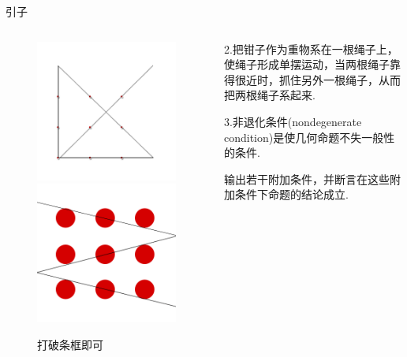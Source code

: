 \documentclass[UTF8, aspectratio=169, 10pt, t]{ctexbeamer}
\begin{document}
\begin{frame}{引子}
	\begin{columns}[c]
		\begin{column}{0.5\textwidth}
			\begin{figure}
				\centering
				\includegraphics[width=0.45\linewidth]{i2}
				\includegraphics[width=0.45\linewidth]{i3}
				\caption{打破条框即可}
				\label{fig:i2}
			\end{figure}
		\end{column}
		\begin{column}{0.5\textwidth}
			2.把钳子作为重物系在一根绳子上，使绳子形成单摆运动，当两根绳子靠得很近时，抓住另外一根绳子，从而把两根绳子系起来. 
			
			\vspace{1em}
			
			3.非退化条件(nondegenerate condition)是使几何命题不失一般性的条件.
			
			\vspace{1em}
			
			输出若干附加条件，并断言在这些附加条件下命题的结论成立.
		\end{column}
	\end{columns}
\end{frame}
\end{document}
